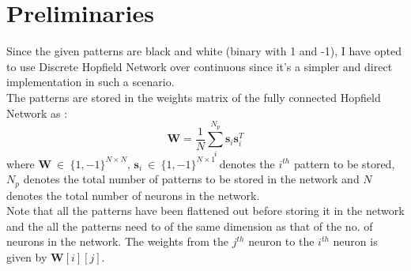 \documentclass{article} %
\begin{document}
\section{Preliminaries}
Since the given patterns are black and white (binary with 1 and -1), I have opted to use Discrete Hopfield Network over continuous since it's a simpler and direct implementation in such a scenario. \\

\noindent The patterns are stored in the weights matrix of the fully connected Hopfield Network as : $$\boldsymbol{W} = \frac{1}{N} \sum_i^{N_p} \boldsymbol{s}_i \boldsymbol{s}_i^T$$
where $\boldsymbol{W} \ \in \ \{ 1, -1\}^{N \times N}$, $\boldsymbol{s}_i \ \in \ \{ 1, -1\}^{N \times 1}$ denotes the $i^{th}$ pattern to be stored, $N_p$ denotes the total number of patterns to be stored in the network and $N$ denotes the total number of neurons in the network.\\

\noindent Note that all the patterns have been flattened out before storing it in the network and the all the patterns need to of the same dimension as that of the no. of neurons in the network. The weights from the $j^{th}$ neuron to the $i^{th}$ neuron is given by $\boldsymbol{W}[i][j]$.\\
\end{document}
